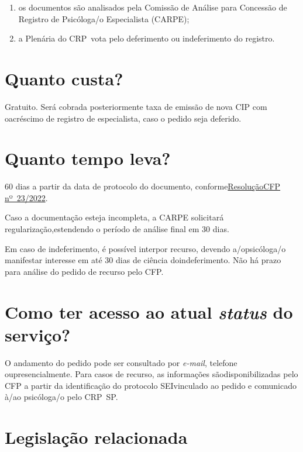 \begin{enumerate}
  \item  os documentos são analisados pela Comissão de Análise para Concessão  de Registro de Psicóloga/o Especialista (CARPE);
  \item  a Plenária do CRP~vota pelo deferimento ou indeferimento do registro.
\end{enumerate}

\section{Quanto custa?}

Gratuito. Será cobrada posteriormente taxa de emissão de nova CIP com oacréscimo de registro de especialista, caso o pedido seja deferido.

\section{Quanto tempo leva?}

60 dias a partir da data de protocolo do documento, conforme\href{https://atosoficiais.com.br/cfp/resolucao-do-exercicio-profissional-n-23-2022-institui-condicoes-para-concessao-e-registro-de-psicologa-e-psicologo-especialistas-reconhece-as-especialidades-da-psicologia-e-revoga-as-resolucoes-cfp-n-13-de-14-de-setembro-de-2007-n-3-de-5-de-fevereiro-de-2016-n-18-de-5-de-setembro-de-2019}{ResoluçãoCFP nº~23/2022}.

Caso a documentação esteja incompleta, a CARPE solicitará regularização,estendendo o período de análise final em 30 dias.

Em caso de indeferimento, é possível interpor recurso, devendo a/opsicóloga/o manifestar interesse em até 30 dias de ciência doindeferimento. Não há prazo para análise do pedido de recurso pelo CFP.

\section{Como ter acesso ao atual \emph{status} do serviço?}

O andamento do pedido pode ser consultado por \emph{e-mail}, telefone oupresencialmente. Para casos de recurso, as informações sãodisponibilizadas pelo CFP a partir da identificação do protocolo SEIvinculado ao pedido e comunicado à/ao psicóloga/o pelo CRP~SP.

\section{Legislação relacionada}


